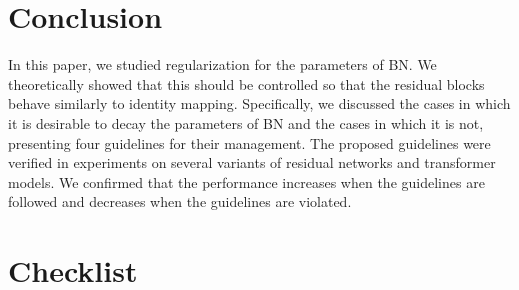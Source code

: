\documentclass{article}
\begin{document}
\section{Conclusion}
\label{sec:conclusion}
In this paper, we studied  regularization for the  parameters of BN. We theoretically showed that this  should be controlled so that the residual blocks behave similarly to identity mapping. Specifically, we discussed the cases in which it is desirable to decay the  parameters of BN and the cases in which it is not, presenting four guidelines for their management. The proposed guidelines were verified in experiments on several variants of residual networks and transformer models. We confirmed that the performance increases when the guidelines are followed and decreases when the guidelines are violated.

\newpage




\newpage

\section*{Checklist}
\end{document}
